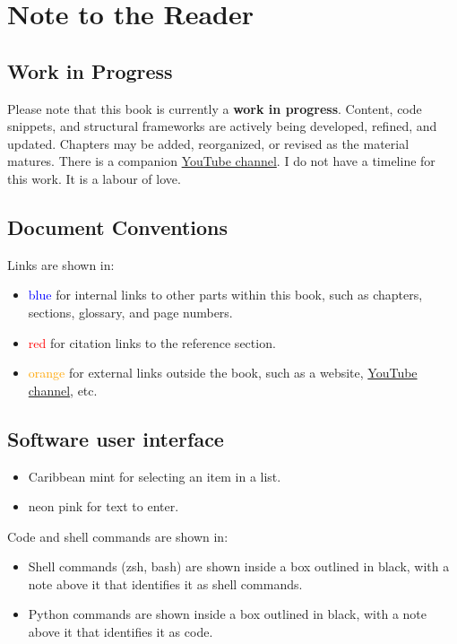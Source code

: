 \chapter{Note to the Reader}
\label{ch:note_to_reader}

\section*{Work in Progress}
Please note that this book is currently a \textbf{work in progress}. Content, code snippets, and structural frameworks are actively being developed, refined, and updated. Chapters may be added, reorganized, or revised as the material matures. There is a companion \href{https://www.youtube.com/@gillespilon13}{YouTube channel}. I do not have a timeline for this work. It is a labour of love.

\section*{Document Conventions}
Links are shown in:
\begin{itemize}
    \item \textcolor{blue}{blue} for internal links to other parts within this book, such as chapters, sections, glossary, and page numbers.
    \item \textcolor{red}{red} for citation links to the reference section.
    \item \textcolor{orange}{orange} for external links outside the book, such as a website, \href{https://www.youtube.com/@gillespilon13}{YouTube channel}, etc.
\end{itemize}

\section*{Software user interface}
\begin{itemize}
    \item \textcolor{SelectItem}{Caribbean mint} for selecting an item in a list.
    \item \textcolor{UserInput}{neon pink} for text to enter.
\end{itemize}

Code and shell commands are shown in:
\begin{itemize}
    \item Shell commands (zsh, bash) are shown inside a box outlined in black, with a note above it that identifies it as shell commands.
    \item Python commands are shown inside a box outlined in black, with a note above it that identifies it as code.
\end{itemize}
